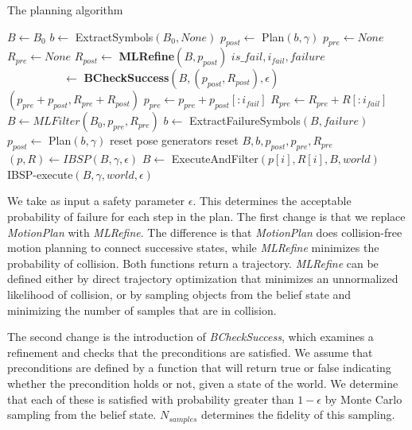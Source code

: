 \begin{algorithm}
 \caption{The \ibsp{} planning algorithm} \label{alg-ibsp}
 \begin{algorithmic}[1]
  \State $B \leftarrow B_0$
  \State $b \leftarrow $ ExtractSymbols$(B_0, None)$
  \State $p_{post} \leftarrow $ Plan$(b, \gamma)$
  \State $p_{pre} \leftarrow None$
  \State $R_{pre} \leftarrow None$
     \State $R_{post} \leftarrow $ \textbf{MLRefine}$(B, p_{post})$
     \State $is\_fail,i_{fail}, failure$\\\ \ \ \ \ \ \ \ \ \ $\leftarrow $ \textbf{BCheckSuccess}$(B, (p_{post}, R_{post}), \epsilon)$
         \State \Return $(p_{pre} + p_{post}, R_{pre} + R_{post})$
     \EndIf
     \State $p_{pre} \leftarrow p_{pre} + p_{post}[:i_{fail}]$
     \State $R_{pre} \leftarrow R_{pre} + R[:i_{fail}]$
     \State $B \leftarrow MLFilter(B_0, p_{pre}, R_{pre})$
     \State $b\leftarrow $ ExtractFailureSymbols$(B, failure)$
     \State $p_{post} \leftarrow $ Plan$(b, \gamma)$     
        \State reset pose generators
        \State reset $B, b, p_{post}, p_{pre}, R_{pre}$
     \EndIf
  \EndWhile
  \EndProcedure
    \State $(p, R) \leftarrow IBSP(B, \gamma, \epsilon)$
      \State $B \leftarrow$ ExecuteAndFilter$(p[i], R[i], B, world)$
        \State \Return IBSP-execute$(B, \gamma, world, \epsilon)$
      \EndIf
    \EndFor
  \EndProcedure
 \end{algorithmic}
\end{algorithm}


We take as input a safety parameter $\epsilon$. This determines the
acceptable probability of failure for each step in the plan. The first
change is that we replace \emph{MotionPlan} with \emph{MLRefine}. The
difference is that \emph{MotionPlan} does collision-free motion
planning to connect successive states, while \emph{MLRefine} minimizes
the probability of collision. Both functions return a trajectory. \emph{MLRefine} can be defined either by
direct trajectory optimization that minimizes an unnormalized likelihood of collision,
or by sampling objects from the belief state and minimizing the number
of samples that are in collision.

The second change is the introduction of \emph{BCheckSuccess}, which examines a refinement and
checks that the preconditions
are satisfied. We assume that preconditions are defined by a function
that will return true or false indicating whether the precondition holds or not,
given a state of the world. We determine
that each of these is satisfied with probability greater than
$1-\epsilon$ by Monte Carlo sampling from the belief
state. $N_{samples}$ determines the fidelity of this sampling.

